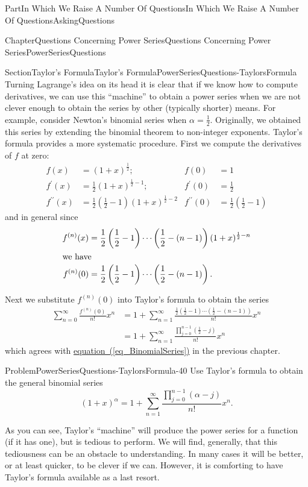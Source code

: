 \documentclass[oneside,10pt,]{book}
\newcommand{\xreffont}{\relax}
\numberwithin{equation}{part}
\newcommand{\amp}{&}
\begin{document}
\begin{partptx}{Part}{In Which We Raise A Number Of Questions}{}{In Which We Raise A Number Of Questions}{}{}{AskingQuestions}
\begin{chapterptx}{Chapter}{Questions Concerning Power Series}{}{Questions Concerning Power Series}{}{}{PowerSeriesQuestions}
\begin{sectionptx}{Section}{Taylor's Formula}{}{Taylor's Formula}{}{}{PowerSeriesQuestions-TaylorsFormula}
Turning Lagrange's idea on its head it is clear that if we know how to compute derivatives, we can use this ``machine'' to obtain a power series when we are not clever enough to obtain the series by other (typically shorter) means.  For example, consider Newton's binomial series when \(\alpha=\frac{1}{2}\).  Originally, we obtained this series by extending the binomial theorem to non-integer exponents. Taylor's formula provides a more systematic procedure. First we compute the derivatives of \(f\) at zero:%
\begin{align*}
f(x)\amp =(1+x)^{\frac{1}{2}};\amp f(0)\amp =1\\
f^\prime(x)\amp =\frac{1}{2}(1+x)^{\frac{1}{2}-1};\amp  f^\prime(0)\amp =\frac{1}{2}\\
f^{\prime\prime}(x)\amp =\frac{1}{2}\left(\frac{1}{2}-1\right)(1+x)^{\frac{1}{2}-2}\amp f^{\prime\prime}(0)\amp =\frac{1}{2}\left(\frac{1}{2}-1\right)
\end{align*}
and in general since%
\begin{align*}
f^{(n)}(x)\amp =\frac{1}{2}\left(\frac{1}{2}-1\right)\cdots\left(\frac{1}{2}-(n-1)\right)(1+x)^{\frac{1}{2}-n}\\
\intertext{we have}
f^{(n)}(0)\amp =\frac{1}{2}\left(\frac{1}{2}-1\right)\cdots\left(\frac{1}{2}-(n-1)\right)\text{.}
\end{align*}
%
\par
Next we substitute  \(f^{(n)}(0)\) into  Taylor's formula to obtain the series%
\begin{align*}
\sum_{n=0}^\infty\frac{f^{(n)}(0)}{n!}x^n \amp{}= 1+\sum_{n=1}^\infty\frac{\frac{1}{2}\left(\frac{1}{2}-1\right)\cdots\left( \frac{1}{2}-(n-1)\right)}{n!}x^n\\
\amp{}= 1+\sum_{n=1}^\infty\frac{\prod_{j=0}^{n-1}\left(\frac{1}{2}-j\right)}{n!}x^n
\end{align*}
which agrees with \hyperref[eq_BinomialSeries]{equation~({\xreffont\ref{eq_BinomialSeries}})} in the previous chapter.%
\begin{problem}{Problem}{}{PowerSeriesQuestions-TaylorsFormula-40}%
Use Taylor's formula to obtain the general binomial series%
\begin{equation*}
(1+x)^\alpha=1+\sum_{n=1}^\infty\frac{\prod_{j=0}^{n-1}\left(\alpha-j\right)}{n!}x^n.{}
\end{equation*}
%
\end{problem}
As you can see, Taylor's ``machine'' will produce the power series for a function (if it has one), but is tedious to perform.  We will find, generally, that this tediousness can be an obstacle to understanding.  In many cases it will be better, or at least quicker, to be clever if we can.  However, it is comforting to have Taylor's formula available as a last resort.%

\end{sectionptx}
\end{chapterptx}
\end{partptx}
\end{document}
